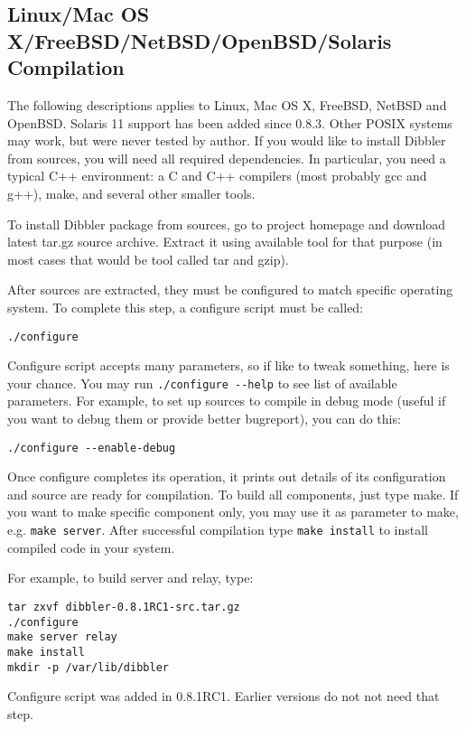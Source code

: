 \subsection{Linux/Mac OS X/FreeBSD/NetBSD/OpenBSD/Solaris Compilation}
The following descriptions applies to Linux, Mac OS X, FreeBSD, NetBSD
and OpenBSD. Solaris 11 support has been added since 0.8.3. 
Other POSIX systems may work, but were never tested by
author. If you would like to install Dibbler from sources, you will need all
required dependencies. In particular, you need a typical C++
environment: a C and C++ compilers (most probably gcc and g++), make,
and several other smaller tools.

To install Dibbler package from sources, go to project homepage and
download latest tar.gz source archive. Extract it using available tool
for that purpose (in most cases that would be tool called tar and
gzip).

After sources are extracted, they must be configured to match specific
operating system. To complete this step, a configure script must be
called:
\begin{lstlisting}
./configure
\end{lstlisting}

Configure script accepts many parameters, so if like to tweak
something, here is your chance. You may run \verb+./configure --help+
to see list of available parameters. For example, to set up sources to
compile in debug mode (useful if you want to debug them or provide
better bugreport), you can do this:

\begin{lstlisting}
./configure --enable-debug
\end{lstlisting}

Once configure completes its operation, it prints out details of its
configuration and source are ready for compilation. To build all
components, just type make. If you want to make specific component
only, you may use it as parameter to make, e.g. 
\verb+make server+. After successful compilation type \verb+make install+ to
install compiled code in your system.

For example, to build server and relay, type:

\begin{lstlisting}
tar zxvf dibbler-0.8.1RC1-src.tar.gz
./configure
make server relay
make install
mkdir -p /var/lib/dibbler
\end{lstlisting}

Configure script was added in 0.8.1RC1. Earlier versions do not not
need that step.

